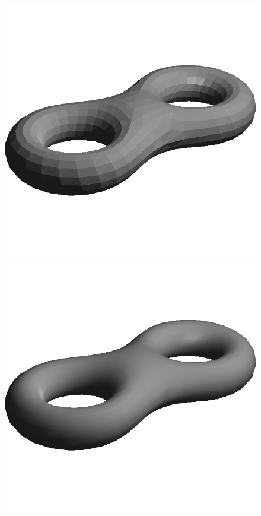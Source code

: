 \begin{figure}[!h]
    \endminipage\hfill
    \centering
    \includegraphics[scale=0.35]{images/eight-fs.png}
    \endminipage\hfill
    \centering
    \centering
    \includegraphics[scale=0.35]{images/eight-gs.png}

\end{figure}
